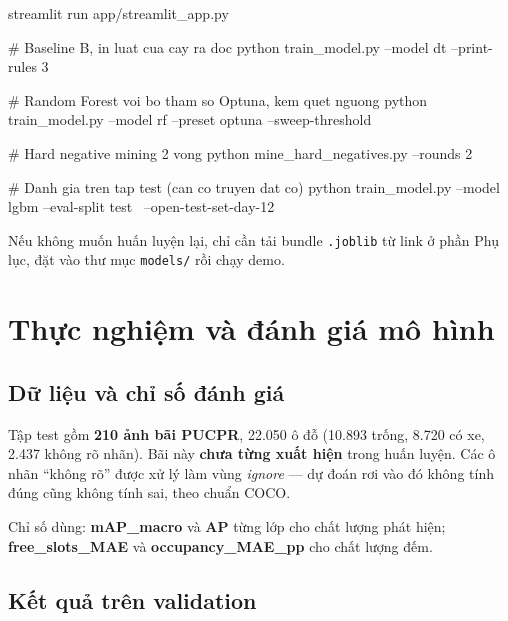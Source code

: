 \documentclass[12pt]{ai_conquer2026}
\begin{document}
\begin{aivncodebox}
\begin{python}
streamlit run app/streamlit_app.py
\end{python}
\end{aivncodebox}

\begin{aivncodebox}
\begin{python}
# Baseline B, in luat cua cay ra doc
python train_model.py --model dt --print-rules 3

# Random Forest voi bo tham so Optuna, kem quet nguong
python train_model.py --model rf --preset optuna --sweep-threshold

# Hard negative mining 2 vong
python mine_hard_negatives.py --rounds 2

# Danh gia tren tap test (can co truyen dat co)
python train_model.py --model lgbm --eval-split test \
       --open-test-set-day-12
\end{python}
\end{aivncodebox}

Nếu không muốn huấn luyện lại, chỉ cần tải bundle \texttt{.joblib} từ link ở phần Phụ lục, đặt vào thư mục \texttt{models/} rồi chạy demo.

\newpage
\section{Thực nghiệm và đánh giá mô hình}
\label{sec:thucnghiem}

\subsection{Dữ liệu và chỉ số đánh giá}

Tập test gồm \textbf{210 ảnh bãi PUCPR}, 22.050 ô đỗ (10.893 trống, 8.720 có xe, 2.437 không rõ nhãn). Bãi này \textbf{chưa từng xuất hiện} trong huấn luyện. Các ô nhãn ``không rõ'' được xử lý làm vùng \textit{ignore} --- dự đoán rơi vào đó không tính đúng cũng không tính sai, theo chuẩn COCO.

Chỉ số dùng: \textbf{mAP\_macro} và \textbf{AP} từng lớp cho chất lượng phát hiện; \textbf{free\_slots\_MAE} và \textbf{occupancy\_MAE\_pp} cho chất lượng đếm.

\subsection{Kết quả trên validation}
\end{document}
